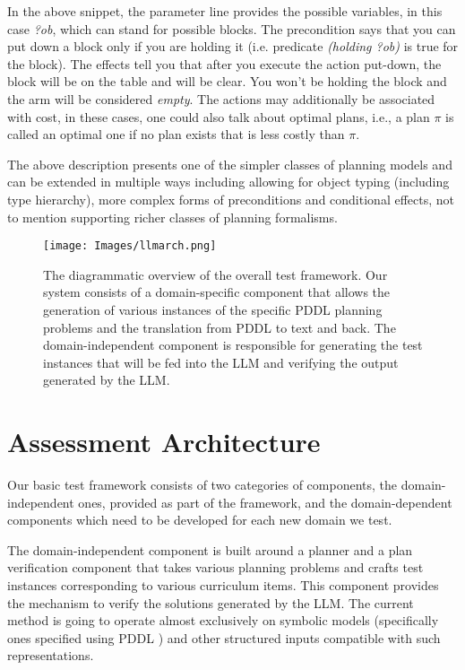 
In the above snippet, the parameter line provides the possible variables, in this case \textit{?ob}, which can stand for possible blocks. The precondition says that you can put down a block only if you are holding it (i.e. predicate \textit{(holding ?ob)} is true for the block). The effects tell you that after you execute the action put-down, the block will be on the table and will be clear. You won't be holding the block and the arm will be considered \textit{empty}. The actions may additionally be associated with cost, in these cases, one could also talk about optimal plans, i.e., a plan $\pi$ is called an optimal one if no plan exists that is less costly than $\pi$.

The above description presents one of the simpler classes of planning models and can be extended in multiple ways including allowing for object typing (including type hierarchy), more complex forms of preconditions and conditional effects, not to mention supporting richer classes of planning formalisms.

\begin{figure}[ht]
    \centering
    \texttt{[image: Images/llmarch.png]}
    \caption{The diagrammatic overview of the overall test framework. Our system consists of a domain-specific component that allows the generation of various instances of the specific PDDL planning problems and the translation from PDDL to text and back. The domain-independent component is responsible for generating the test instances that will be fed into the LLM and verifying the output generated by the LLM.}
        \label{fig:overall}
        \vspace*{-0.2in}
\end{figure}

\section{Assessment Architecture}

Our basic test framework consists of two categories of components, the domain-independent ones, provided as part of the framework, and the domain-dependent components which need to be developed for each new domain we test.

 The domain-independent component is built around a planner and a plan verification component that takes various planning problems and crafts test instances corresponding to various curriculum items. This component provides the mechanism to verify the solutions generated by the LLM. The current method is going to operate almost exclusively on symbolic models (specifically ones specified using PDDL \cite{McDermott1998PDDLthePD}) and other structured inputs compatible with such representations.  

